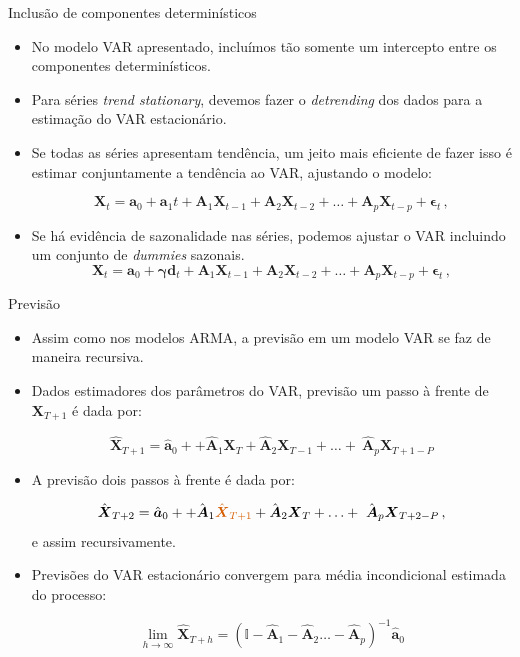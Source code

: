 \documentclass[11pt]{beamer}
\begin{document}
\begin{frame}{Inclusão de componentes determinísticos}
	\begin{itemize}
		\item No modelo VAR apresentado, incluímos tão somente um intercepto entre os componentes determinísticos.
		\item Para  séries \textit{trend stationary}, devemos fazer o \textit{detrending} dos dados para a estimação do VAR estacionário.
		\item Se todas as séries apresentam tendência, um jeito mais eficiente de fazer isso é estimar conjuntamente a tendência ao VAR, ajustando o modelo:
		
			\begin{equation*}
			\boldsymbol{X}_t = \boldsymbol{a}_0 +\boldsymbol{a}_1 t + \boldsymbol{A}_1 \boldsymbol{X}_{t-1} + \boldsymbol{A}_2 \boldsymbol{X}_{t-2} + \ldots + \boldsymbol{A}_p \boldsymbol{X}_{t-p} + \boldsymbol{\epsilon}_t \, ,
		\end{equation*}
		
		\item Se há evidência de sazonalidade nas séries, podemos ajustar o VAR incluindo um conjunto de \textit{dummies} sazonais.
			\begin{equation*}
			\boldsymbol{X}_t = \boldsymbol{a}_0 +\boldsymbol{\gamma} \boldsymbol{d}_t + \boldsymbol{A}_1 \boldsymbol{X}_{t-1} + \boldsymbol{A}_2 \boldsymbol{X}_{t-2} + \ldots + \boldsymbol{A}_p \boldsymbol{X}_{t-p} + \boldsymbol{\epsilon}_t \, ,
		\end{equation*}
	\end{itemize}
\end{frame}

\begin{frame}{Previsão}
	\begin{itemize}
		\item Assim como nos modelos ARMA, a previsão em um modelo VAR se faz de maneira recursiva.
		\item Dados estimadores dos parâmetros do VAR,  previsão um passo à frente de $\boldsymbol{X}_{T+1}$ é dada por:
		
		$$\hat{\boldsymbol{X}}_{T+1} = \hat{\boldsymbol{a}}_0 + + \hat{\boldsymbol{A}}_1 \boldsymbol{X}_{T} + \hat{\boldsymbol{A}}_2 \boldsymbol{X}_{T-1} + \ldots + \ \hat{\boldsymbol{A}}_p \boldsymbol{X}_{T+1-P}  $$
		\item A previsão dois passos à frente é dada por: 
		
		$$\hat{\boldsymbol{X}}_{T+2} = \hat{\boldsymbol{a}}_0 + + \hat{\boldsymbol{A}}_1 {\color{red}\hat{\boldsymbol{X}}_{T+1} }+ \hat{\boldsymbol{A}}_2 \boldsymbol{X}_{T} + \ldots + \ \hat{\boldsymbol{A}}_p \boldsymbol{X}_{T+2-P}  \, ,$$
		e assim recursivamente.
		\item Previsões do VAR estacionário convergem para média incondicional estimada do processo:
		
		$$\lim_{h \to \infty }\hat{\boldsymbol{X}}_{T+h} = (\mathbb{I}-  \hat{\boldsymbol{A}}_1 -  \hat{\boldsymbol{A}}_2 \ldots -  \hat{\boldsymbol{A}}_p )^{-1}\hat{\boldsymbol{a}}_0 $$
	\end{itemize}
\end{frame}
\end{document}
